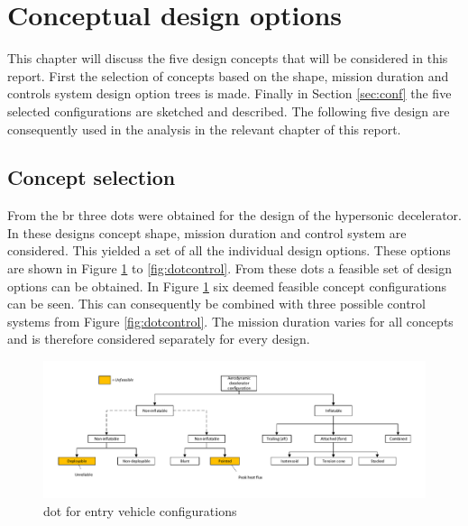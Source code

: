 \section{Conceptual design options} \label{ch:options}
This chapter will discuss the five design concepts that will be considered in this report. First the selection of concepts based on the shape, mission duration and controls system design option trees is made. Finally in Section \ref{sec:conf} the five selected configurations are sketched and described. The following five design are consequently used in the analysis in the relevant chapter of this report.

\subsection{Concept selection}
 From the \acrfull{br} three \glspl{dot} were obtained for the design of the hypersonic decelerator. In these designs concept shape, mission duration and control system are considered. This yielded a set of all the individual design options. These options are shown in Figure \ref{fig:dotshape} to \ref{fig:dotcontrol}. From these \glspl{dot} a feasible set of design options can be obtained. In Figure \ref{fig:dotshape} six deemed feasible concept configurations  can be seen. This can consequently be combined with three possible control systems from Figure \ref{fig:dotcontrol}. The mission duration varies for all concepts and is therefore considered separately for every design. 

\begin{figure}[H]
\hspace{-23mm}
\includegraphics[width = 1.25\textwidth]{Figure/DOT_configuration.pdf}
\vspace{-5mm}
\caption{\acrlong{dot} for entry vehicle configurations}
\label{fig:dotshape}
\end{figure}

